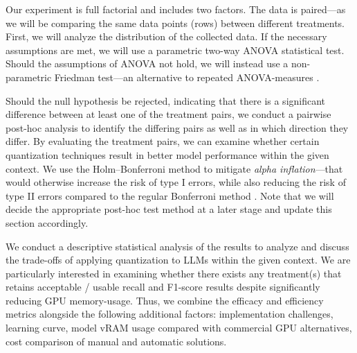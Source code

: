 \documentclass[conference]{IEEEtran}
\begin{document}
Our experiment is full factorial and includes two factors. The data is paired---as we will be comparing the same data points (rows) between different treatments. First, we will analyze the distribution of the collected data. If the necessary assumptions are met, we will use a parametric two-way ANOVA statistical test. Should the assumptions of ANOVA not hold, we will instead use a non-parametric Friedman test---an alternative to repeated ANOVA-measures \cite{mccrum2008statisticalTests}.


Should the null hypothesis be rejected, indicating that there is a significant difference between at least one of the treatment pairs, we conduct a pairwise post-hoc analysis to identify the differing pairs as well as in which direction they differ. By evaluating the treatment pairs, we can examine whether certain quantization techniques result in better model performance within the given context. 
We use the Holm–Bonferroni method to mitigate \textit{alpha inflation}---that would otherwise increase the risk of type I errors, while also reducing the risk of type II errors compared to the regular Bonferroni method \cite{abdi2010HolmBonferroni}.
Note that we will decide the appropriate post-hoc test method at a later stage and update this section accordingly.

We conduct a descriptive statistical analysis of the results to analyze and discuss the trade-offs of applying quantization to LLMs within the given context. We are particularly interested in examining whether there exists any treatment(s) that retains acceptable / usable recall and F1-score results despite significantly reducing GPU memory-usage. Thus, we combine the efficacy and efficiency metrics alongside the following additional factors: implementation challenges, learning curve, model vRAM usage compared with commercial GPU alternatives, cost comparison of manual and automatic solutions. 
\end{document}
